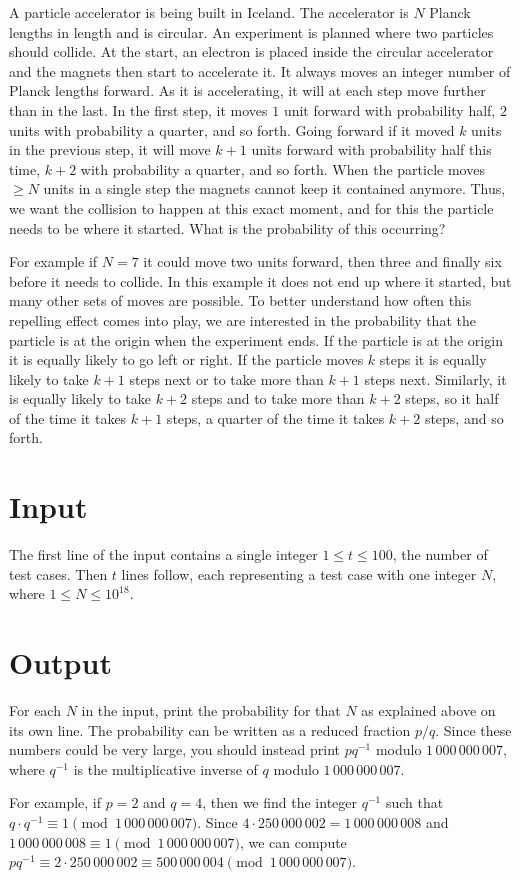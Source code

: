 
A particle accelerator is being built in Iceland.
The accelerator is $N$ Planck lengths in length and is circular.
An experiment is planned where two particles should collide.
At the start, an electron is placed inside the circular accelerator and the magnets then start to accelerate it.
It always moves an integer number of Planck lengths forward.
As it is accelerating, it will at each step move further than in the last.
In the first step, it moves $1$ unit forward with probability half, $2$ units with probability a quarter, and so forth.
Going forward if it moved $k$ units in the previous step, it will move $k + 1$ units forward with probability half this time,
$k + 2$ with probability a quarter, and so forth.
When the particle moves $\geq N$ units in a single step the magnets cannot keep it contained anymore.
Thus, we want the collision to happen at this exact moment, and for this the particle needs to be where it started.
What is the probability of this occurring?

For example if $N = 7$ it could move two units forward, then three and finally six before it needs to collide.
In this example it does not end up where it started, but many other sets of moves are possible.
To better understand how often this repelling effect comes into play,
we are interested in the probability that the particle is at the origin when the experiment ends.
If the particle is at the origin it is equally likely to go left or right.
If the particle moves $k$ steps it is equally likely to take $k + 1$ steps next or to take more than $k + 1$ steps next.
Similarly, it is equally likely to take $k + 2$ steps and to take more than $k + 2$ steps,
so it half of the time it takes $k + 1$ steps, a quarter of the time it takes $k + 2$ steps, and so forth.

\section*{Input}
The first line of the input contains a single integer $1 \leq t \leq 100$, the number of test cases.
Then $t$ lines follow, each representing a test case with one integer $N$, where $1 \leq N \leq 10^{18}$.

\section*{Output}
For each $N$ in the input, print the probability for that $N$ as explained above on its own line.
The probability can be written as a reduced fraction $p/q$.
Since these numbers could be very large, you should instead print $pq^{-1}$ modulo $1\,000\,000\,007$,
where $q^{-1}$ is the multiplicative inverse of $q$ modulo $1\,000\,000\,007$.

For example, if $p=2$ and $q=4$, then we find the integer $q^{-1}$ such that $q \cdot q^{-1} \equiv 1 \pmod{1\,000\,000\,007}$.
Since $4 \cdot 250\,000\,002 = 1\,000\,000\,008$ and $1\,000\,000\,008 \equiv 1 \pmod{1\,000\,000\,007}$, we can compute
$pq^{-1} \equiv 2 \cdot 250\,000\,002 \equiv 500\,000\,004 \pmod{1\,000\,000\,007}$.
